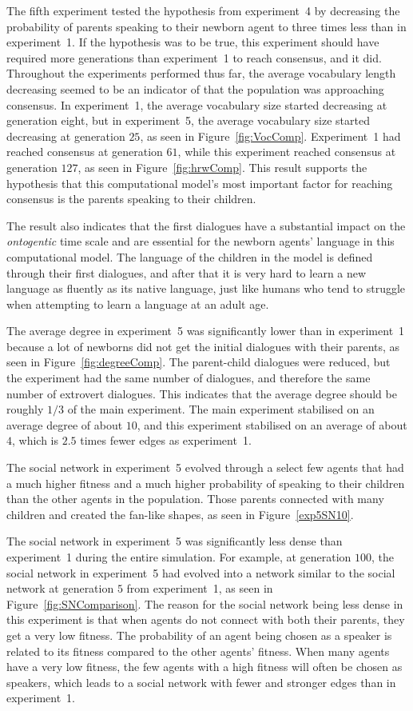 The fifth experiment tested the hypothesis from experiment~4 by decreasing the probability of parents speaking to their newborn agent to three times less than in experiment~1. If the hypothesis was to be true, this experiment should have required more generations than experiment~1 to reach consensus, and it did. Throughout the experiments performed thus far, the average vocabulary length decreasing seemed to be an indicator of that the population was approaching consensus. In experiment~1, the average vocabulary size started decreasing at generation eight, but in experiment~5, the average vocabulary size started decreasing at generation $25$, as seen in Figure~\ref{fig:VocComp}. Experiment~1 had reached consensus at generation $61$, while this experiment reached consensus at generation $127$, as seen in Figure~\ref{fig:hrwComp}. This result supports the hypothesis that this computational model's most important factor for reaching consensus is the parents speaking to their children. 

The result also indicates that the first dialogues have a substantial impact on the \textit{ontogentic} time scale and are essential for the newborn agents' language in this computational model. The language of the children in the model is defined through their first dialogues, and after that it is very hard to learn a new language as fluently as its native language, just like humans who tend to struggle when attempting to learn a language at an adult age. 

The average degree in experiment~5 was significantly lower than in experiment~1 because a lot of newborns did not get the initial dialogues with their parents, as seen in Figure~\ref{fig:degreeComp}. The parent-child dialogues were reduced, but the experiment had the same number of dialogues, and therefore the same number of extrovert dialogues. This indicates that the average degree should be roughly $1/3$ of the main experiment. The main experiment stabilised on an average degree of about $10$, and this experiment stabilised on an average of about $4$, which is $2.5$ times fewer edges as experiment~1. 

The social network in experiment~5 evolved through a select few agents that had a much higher fitness and a much higher probability of speaking to their children than the other agents in the population. Those parents connected with many children and created the fan-like shapes, as seen in Figure~\ref{exp5SN10}. 

The social network in experiment~5 was significantly less dense than experiment~1 during the entire simulation. For example, at generation $100$, the social network in experiment~5 had evolved into a network similar to the social network at generation $5$ from experiment~1, as seen in Figure~\ref{fig:SNComparison}. The reason for the social network being less dense in this experiment is that when agents do not connect with both their parents, they get a very low fitness. The probability of an agent being chosen as a speaker is related to its fitness compared to the other agents' fitness. When many agents have a very low fitness, the few agents with a high fitness will often be chosen as speakers, which leads to a social network with fewer and stronger edges than in experiment~1.

